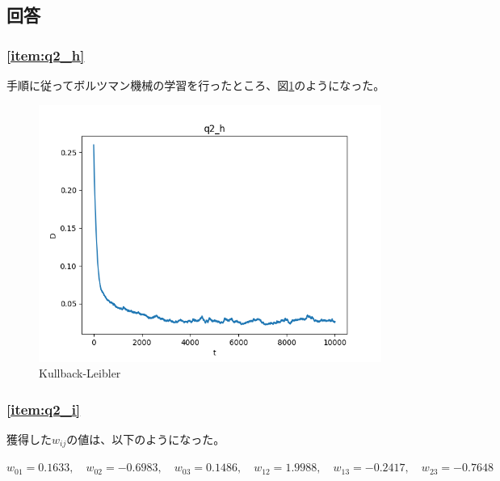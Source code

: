 \documentclass[a4j, uplatex, fleqn, dvipdfmx]{jsarticle} %
\begin{document}
\subsection{回答}
\subsubsection{\ref{item:q2_h}}
手順に従ってボルツマン機械の学習を行ったところ、図\ref{fig:q2_h_graph}のようになった。
\begin{figure}[htbp]
  \centering
  \includegraphics[width=12cm]{images/q2_h_graph.png}
  \caption{Kullback-Leibler}
  \label{fig:q2_h_graph}
\end{figure}


\subsubsection{\ref{item:q2_i}}
獲得した$w_{ij}$の値は、以下のようになった。

$w_{01}=0.1633,\quad w_{02}=-0.6983,\quad w_{03}=0.1486,\quad w_{12}=1.9988,\quad w_{13}=-0.2417,\quad w_{23}=-0.7648$
\end{document}
